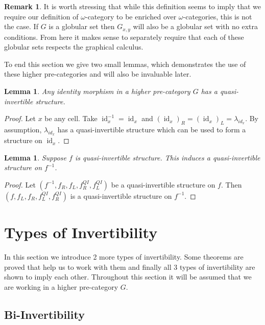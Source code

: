 \documentclass[draft]{article}
\newtheorem{lemma}[theorem]{Lemma} \theoremstyle{definition}
\newtheorem{remark}[theorem]{Remark} \newtheorem*{claim}{Claim}
\DeclareMathOperator{\id}{id}
\newcommand{\inv}[1]{#1^{-1}} \newcommand{\comp}{\star}
\begin{document}
\begin{remark}
  It is worth stressing that while this definition seems to imply that
  we require our definition of \(\omega\)-category to be enriched over
  \(\omega\)-categories, this is not the case. If \(G\) is a globular
  set then \(G_{x,y}\) will also be a globular set with no extra
  conditions. From here it makes sense to separately require that each
  of these globular sets respects the graphical calculus.
\end{remark}

To end this section we give two small lemmas, which demonstrates the
use of these higher pre-categories and will also be invaluable later.

\begin{lemma}\label{identity}
  Any identity morphism in a higher pre-category \(G\) has a
  quasi-invertible structure.
\end{lemma}

\begin{proof}
  Let \(x\) be any cell. Take \(\inv {\id_x} = \id_x\) and
  \({(\id_x)}_R = {(\id_x)}_L = \lambda_{id_x}\). By assumption,
  \(\lambda_{id_x}\) has a quasi-invertible structure which can be
  used to form a structure on \(\id_x\).
\end{proof}

\begin{lemma}\label{inverse-invert}
  Suppose \(f\) is quasi-invertible structure. This induces a
  quasi-invertible structure on \(\inv f\).
\end{lemma}

\begin{proof}
  Let \((\inv f, f_R, f_L, f_R^{QI}, f_L^{QI})\) be a quasi-invertible
  structure on \(f\). Then \((f , f_L, f_R, f_L^{QI}, f_R^{QI})\) is a
  quasi-invertible structure on \(\inv f\).
\end{proof}

\section{Types of Invertibility}\label{sec:invertibility}

In this section we introduce 2 more types of invertibility. Some
theorems are proved that help us to work with them and finally all 3
types of invertibility are shown to imply each other. Throughout this
section it will be assumed that we are working in a higher
pre-category \(G\).

\subsection{Bi-Invertibility}\label{sec:bi-invertibility}
\end{document}
